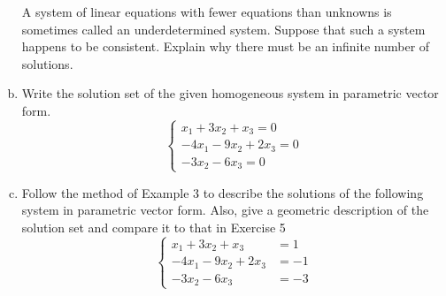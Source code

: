 \begin{enumerate}[(a)]
    A system of linear equations with fewer equations than unknowns is sometimes called an underdetermined system. Suppose that such a system happens to be consistent. Explain why there must be an infinite number of solutions.
    \item
    Write the solution set of the given homogeneous system in parametric vector form.
    \begin{equation*}
        \begin{cases}
            x_{1}+3 x_{2}+x_{3}=0\\
            -4 x_{1}-9 x_{2}+2 x_{3}=0 \\
            -3 x_{2}-6 x_{3}=0
        \end{cases}
    \end{equation*}
    \item
    Follow the method of Example 3 to describe the solutions of the following system in parametric vector form. Also, give a geometric description of the solution set and compare it to that in Exercise 5
    \begin{equation*}
        \begin{cases}
            x_{1}+3 x_{2}+x_{3} &=1 \\
            -4 x_{1}-9 x_{2}+2 x_{3} &=-1 \\
            -3 x_{2}-6 x_{3} &=-3
        \end{cases}
    \end{equation*}
\end{enumerate}